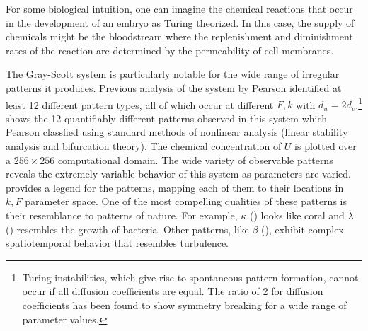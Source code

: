 For some biological intuition, one can imagine the chemical reactions that occur in the development of an embryo as Turing theorized. In this case, the supply of chemicals might be the bloodstream where the replenishment and diminishment rates of the reaction are determined by the permeability of cell membranes.

The Gray-Scott system is particularly notable for the wide range of irregular patterns it produces. Previous analysis of the system by Pearson identified at least 12 different pattern types, all of which occur at different $F, k$ with $d_u = 2 d_v$.\footnote{Turing instabilities, which give rise to spontaneous pattern formation, cannot occur if all diffusion coefficients are equal. The ratio of 2 for diffusion coefficients has been found to show symmetry breaking for a wide range of parameter values.}  shows the 12 quantifiably different patterns observed in this system which Pearson classfied using standard methods of nonlinear analysis (\eg linear stability analysis and bifurcation theory). The chemical concentration of $U$ is plotted over a $256 \times 256$ computational domain. The wide variety of observable patterns reveals the extremely variable behavior of this system as parameters are varied.  provides a legend for the patterns, mapping each of them to their locations in $k, F$ parameter space. One of the most compelling qualities of these patterns is their resemblance to patterns of nature. For example, $\kappa$ () looks like coral and $\lambda$ () resembles the growth of bacteria. Other patterns, like $\beta$ (), exhibit complex spatiotemporal behavior that resembles turbulence.

